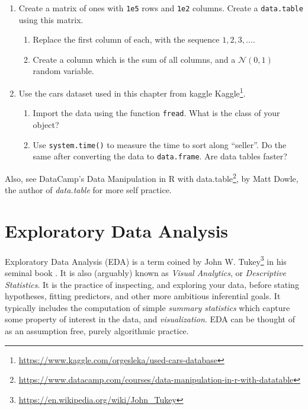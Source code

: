 \documentclass[]{book}
\providecommand{\tightlist}{%
  \setlength{\itemsep}{0pt}\setlength{\parskip}{0pt}}
\renewcommand{\href}[2]{#2\footnote{\url{#1}}}
\theoremstyle{definition}
\theoremstyle{definition}
\theoremstyle{definition}
\theoremstyle{remark}
\begin{document}
\begin{enumerate}
\def\labelenumi{\arabic{enumi}.}
\tightlist
\item
  Create a matrix of ones with \texttt{1e5} rows and \texttt{1e2} columns. Create a \texttt{data.table} using this matrix.

  \begin{enumerate}
  \def\labelenumii{\arabic{enumii}.}
  \tightlist
  \item
    Replace the first column of each, with the sequence \(1,2,3,\dots\).
  \item
    Create a column which is the sum of all columns, and a \(\mathcal{N}(0,1)\) random variable.
  \end{enumerate}
\item
  Use the cars dataset used in this chapter from kaggle \href{https://www.kaggle.com/orgesleka/used-cars-database}{Kaggle}.

  \begin{enumerate}
  \def\labelenumii{\arabic{enumii}.}
  \tightlist
  \item
    Import the data using the function \texttt{fread}. What is the class of your object?
  \item
    Use \texttt{system.time()} to measure the time to sort along ``seller''. Do the same after converting the data to \texttt{data.frame}. Are data tables faster?
  \end{enumerate}
\end{enumerate}

Also, see DataCamp's \href{https://www.datacamp.com/courses/data-manipulation-in-r-with-datatable}{Data Manipulation in R with data.table}, by Matt Dowle, the author of \emph{data.table} for more self practice.

\hypertarget{eda}{%
\chapter{Exploratory Data Analysis}\label{eda}}

Exploratory Data Analysis (EDA) is a term coined by \href{https://en.wikipedia.org/wiki/John_Tukey}{John W. Tukey} in his seminal book \citep{tukey1977exploratory}.
It is also (arguably) known as \emph{Visual Analytics}, or \emph{Descriptive Statistics}.
It is the practice of inspecting, and exploring your data, before stating hypotheses, fitting predictors, and other more ambitious inferential goals.
It typically includes the computation of simple \emph{summary statistics} which capture some property of interest in the data, and \emph{visualization}.
EDA can be thought of as an assumption free, purely algorithmic practice.
\end{document}

